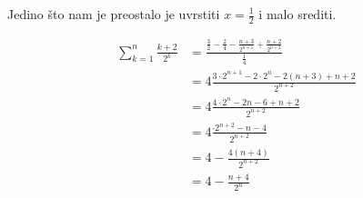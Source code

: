 \documentclass[exam.tex]{subfiles}
\begin{document}
	Jedino što nam je preostalo je uvrstiti \( x = \frac{1}{2} \) i malo srediti.
	
	\begin{align*}
		\sum\limits_{k=1}^n \frac{k + 2}{2^k} &= \frac{\frac{3}{2} - \frac{2}{4} -  \frac{n + 3}{2^{n + 1}} + \frac{n + 2}{2^{n + 2}}}{\frac{1}{4}} \\
		&= 4 \frac{3 \cdot 2^{n + 1} - 2 \cdot 2^{n} - 2(n + 3) + n + 2}{2^{n + 2}} \\
		&= 4 \frac{4 \cdot 2^{n} - 2n - 6 + n + 2}{2^{n + 2}} \\
		&= 4 \frac{\cdot 2^{n+2} - n - 4}{2^{n + 2}} \\
		&= 4 - \frac{4(n + 4)}{2^{n + 2}} \\
		&= 4 - \frac{n + 4}{2^n}
	\end{align*}
\end{document}
